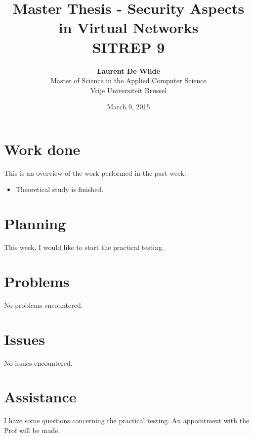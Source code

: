 \documentclass[11pt, a4paper]{article}
\title{Master Thesis -  Security Aspects in Virtual Networks\\ \textbf{SITREP 9}}
\author{\textbf{Laurent De Wilde} \\ Master of Science in the Applied Computer Science \\ Vrije Universiteit Brussel}
\date{March 9, 2015}
\begin{document}
\maketitle

\section*{Work done}

This is an overview of the work performed in the past week:
\begin{itemize}
\item Theoretical study is finished.
\end{itemize}

\section*{Planning}
 
This week, I would like to start the practical testing.

\section*{Problems}

No problems encountered.

\section*{Issues}

No issues encountered.

\section*{Assistance}

I have some questions concerning the practical testing. An appointment with the Prof will be made.
\end{document}
